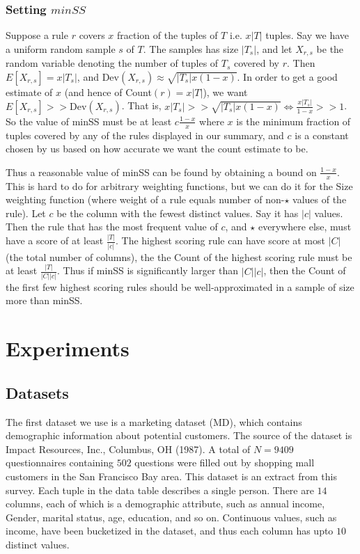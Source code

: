 \documentclass{sig-alternate}
\begin{document}
\subsubsection{Setting $minSS$}
Suppose a rule $r$ covers $x$ fraction of the tuples of $T$ i.e. $x|T|$ tuples. Say we have a uniform random sample $s$ of $T$. The samples has size $|T_s|$, and let $X_{r,s}$ be the random variable denoting the number of tuples of $T_s$ covered by $r$. Then $E\left[ X_{r,s} \right] = x|T_s|$, and $\text{Dev}(X_{r,s}) \approx \sqrt{|T_s|x(1-x)}$. In order to get a good estimate of $x$ (and hence of Count$(r) = x|T|$), we want $E\left[X_{r,s}\right] >> \text{Dev}(X_{r,s})$. That is, $x|T_s| >> \sqrt{|T_s|x(1-x)} \Leftrightarrow \frac{x|T_s|}{1-x} >> 1$. So the value of minSS must be at least $c\frac{1-x}{x}$ where $x$ is the minimum fraction of tuples covered by any of the rules displayed in our summary, and $c$ is a constant chosen by us based on how accurate we want the count estimate to be.

Thus a reasonable value of minSS can be found by obtaining a bound on $\frac{1-x}{x}$. This is hard to do for arbitrary weighting functions, but we can do it for the Size weighting function (where weight of a rule equals number of non-$\star$ values of the rule). Let $c$ be the column with the fewest distinct values. Say it has $|c|$ values. Then the rule that has the most frequent value of $c$, and $\star$ everywhere else, must have a score of at least $\frac{|T|}{|c|}$. The highest scoring rule can have score at most $|C|$ (the total number of columns), the the Count of the highest scoring rule must be at least $\frac{|T|}{|C||c|}$. Thus if minSS is significantly larger than $|C||c|$, then the Count of the first few highest scoring rules should be well-approximated in a sample of size more than minSS. 

\section{Experiments}
\subsection{Datasets}
The first dataset we use is a marketing dataset (MD), which contains demographic information about potential customers. The source of the dataset is Impact Resources, Inc., Columbus, OH (1987). A total of $N=9409$ questionnaires containing $502$ questions were 
filled out by shopping mall customers in the San Francisco Bay area. This dataset is an extract from this survey. Each tuple in the data table describes a single person. There are $14$ columns, each of which is a demographic attribute, such as annual income, Gender, marital status, age, education, and so on. Continuous values, such as income, have been bucketized in the dataset, and thus each column has upto $10$ distinct values. 
\end{document}
